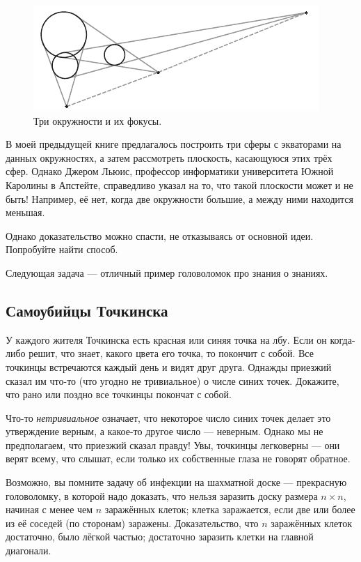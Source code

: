 \begin{figure}[h!]
\centering
\includegraphics[scale=1]{pics/3circs}
\caption{Три окружности и их фокусы.}
\label{pic:3circ}
\end{figure}

В моей предыдущей книге \cite{59} предлагалось построить три сферы с экваторами на данных окружностях, а затем рассмотреть плоскость, касающуюся этих трёх сфер.
Однако Джером Льюис, профессор информатики университета Южной Каролины в Апстейте, справедливо указал на то, что такой плоскости может и не быть!
Например, её нет, когда две окружности большие, а между ними находится меньшая.

Однако доказательство можно спасти, не отказываясь от основной идеи.
Попробуйте найти способ.

\medskip

Следующая задача --- отличный пример головоломок про знания о знаниях.

\subsection*{Самоубийцы Точкинска}

У каждого жителя Точкинска есть красная или синяя точка на лбу.
Если он когда-либо решит, что знает, какого цвета его точка, то покончит с собой.
Все точкинцы встречаются каждый день и видят друг друга.
Однажды приезжий сказал им что-то (что угодно не тривиальное) о числе синих точек.
Докажите, что рано или поздно все точкинцы покончат с собой.

 Что-то \emph{нетривиальное} означает, что некоторое число синих точек делает это утверждение верным, а какое-то другое число --- неверным.
Однако мы не предполагаем, что приезжий сказал правду!
Увы, точкинцы легковерны --- они верят всему, что слышат, если только их собственные глаза не говорят обратное.

\medskip

Возможно, вы помните задачу об инфекции на шахматной доске --- прекрасную головоломку, в которой надо доказать, что нельзя заразить доску размера $n \times n$, начиная с менее чем $n$ заражённых клеток;
клетка заражается, если две или более из её соседей (по сторонам) заражены.
Доказательство, что $n$ заражённых клеток достаточно, было лёгкой частью; достаточно заразить клетки на главной диагонали.

